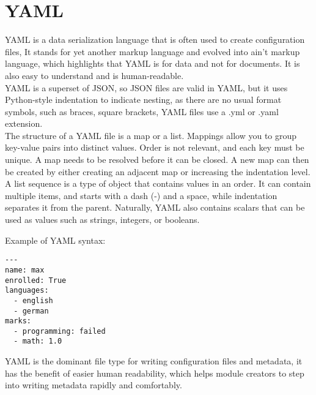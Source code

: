 \section{YAML}
YAML is a data serialization language that is often used to create configuration files,
It stands for yet another markup language and evolved into ain’t markup language,  which highlights that YAML is for data and not for documents. It is also easy to understand and is human-readable.\\
YAML is a superset of JSON, so JSON files are valid in YAML, but it uses Python-style indentation to indicate nesting, as there are no usual format symbols, such as braces, square brackets, YAML files use a .yml or .yaml extension.\\
The structure of a YAML file is a map or a list.
Mappings allow you to group key-value pairs into distinct values. Order is not relevant, and each key must be unique. A map needs to be resolved before it can be closed. A new map can then be created by either creating an adjacent map or increasing the indentation level.\\
A list sequence is a type of object that contains values in an order. It can contain multiple items, and starts with a dash (-) and a space, while indentation separates it from the parent.
Naturally, YAML also contains scalars that can be used as values such as strings, integers, or booleans\cite{yaml_redhat}.

Example of YAML syntax:

\begin{lstlisting}[caption=YAML example, style=pythonstyle]
---
name: max
enrolled: True
languages:
  - english
  - german
marks:
  - programming: failed
  - math: 1.0

\end{lstlisting}
YAML is the dominant file type for writing configuration files and metadata, it has the benefit of easier human readability, which helps module creators to step into writing metadata rapidly and comfortably.
